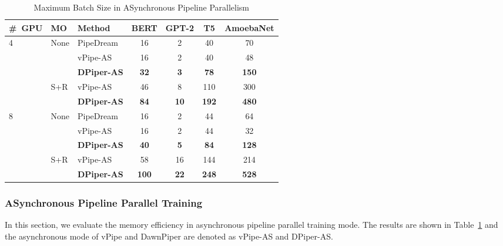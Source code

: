 \begin{table}[htbp]
  \centering
  \caption{Maximum Batch Size in ASynchronous Pipeline Parallelism}
    \begin{tabular}{m{2em}|m{2em}|m{5em}cccc}
    \toprule
    \#\ GPU & MO & Method & BERT & GPT-2 & T5 & AmoebaNet \\
    \midrule
    \multirow{5}{*}{4} & \multirow{3}{*}{None} & PipeDream & 16    & 2     & 40    & 70 \\
          &       & vPipe-AS & 16    & 2     & 40    & 48 \\
          &       & \textbf{DPiper-AS} & \textbf{32} & \textbf{3} & \textbf{78} & \textbf{150} \\
\cmidrule{2-7}          & \multirow{2}{*}{S+R} & vPipe-AS & 46    & 8     & 110   & 300 \\
          &       & \textbf{DPiper-AS} & \textbf{84} & \textbf{10} & \textbf{192} & \textbf{480} \\
    \midrule
    \multirow{5}{*}{8} & \multirow{3}{*}{None} & PipeDream & 16    & 2     & 44    & 64 \\
          &       & vPipe-AS & 16    & 2     & 44    & 32 \\
          &       & \textbf{DPiper-AS} & \textbf{40} & \textbf{5} & \textbf{84} & \textbf{128} \\
\cmidrule{2-7}          & \multirow{2}{*}{S+R} & vPipe-AS & 58    & 16    & 144   & 214 \\
          &       & \textbf{DPiper-AS} & \textbf{100} & \textbf{22} & \textbf{248} & \textbf{528} \\
    \bottomrule
    \end{tabular}%
  \label{table:maxbs-async}%
\end{table}

\subsubsection{ASynchronous Pipeline Parallel Training}
In this section, we evaluate the memory efficiency in asynchronous pipeline parallel training mode.
The results are shown in Table~\ref{table:maxbs-async}
and the asynchronous mode of vPipe and DawnPiper are denoted as vPipe-AS and DPiper-AS.

